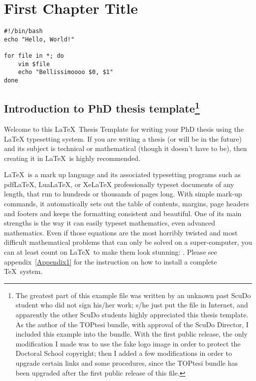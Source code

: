 
\chapter{First Chapter Title}  %
\label{chapter 1}
    \graphicspath{{Chapter1/Images/}}
    
    \begin{verbatim}
#!/bin/bash
echo "Hello, World!"

for file in *; do
    vim $file
    echo "Bellissimoooo $0, $1"
done
    \end{verbatim}


\section[Introduction to PhD thesis template]{Introduction to PhD thesis template\footnote{The greatest part of this example file was written by an unknown past ScuDo student who did not sign his/her work; s/he just put the file in Internet, and apparently the other ScuDo students highly appreciated this thesis template. As the author of the TOPtesi bundle, with approval of the ScuDo Director, I included this example into the bundle. With the first public release, the only modification I made was to use the fake logo image in order to protect the Doctoral School copyright; then I added a few modifications in order to upgrade certain links and some procedures, since the TOPtesi bundle has been upgraded after the first public release of this file.}} %
\label{section 1.1} %

Welcome to this \LaTeX\ Thesis Template for writing your PhD thesis using the \LaTeX{} typesetting system. If you are writing a thesis (or will be in the future) and its subject is technical or mathematical (though it doesn't have to be), then creating it in \LaTeX\ is highly recommended.

\LaTeX\ is a mark up language and its associated typesetting programs such as pdfLaTeX, LuaLaTeX, or XeLaTeX professionally typeset documents of any length,  that run to hundreds or thousands of pages long. With simple mark-up commands, it automatically sets out the table of contents, margins, page headers and footers and keeps the formatting consistent and beautiful. One of its main strengths is the way it can easily typeset mathematics, even advanced mathematics. Even if those equations are the most horribly twisted and most difficult mathematical problems that can only be solved on a super-computer, you can at least count on \LaTeX\ to make them look stunning: \cite{lamport1994latex, misc:Lshort}. Please see appendix~\ref{Appendix1} for the instruction on how to install a complete \TeX\ system.

